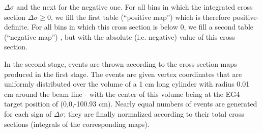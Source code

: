 $\Delta \sigma$ and the next for the negative one. For all bins in which the integrated cross section $\Delta \sigma \ge 0$, we fill the first table (``positive map'') which is therefore positive-definite. For all bins in which this cross section is below $0$, we fill a second table (``negative map'') , but with the absolute (i.e. negative) value of this cross section. %


In the second stage, events are thrown %
according to the cross section maps produced in the first stage. %
The events are given vertex coordinates that are uniformly distributed over the volume of a 1 cm long cylinder with radius 0.01 cm around the beam line - with the center of this volume being at the EG4 target position of (0,0,-100.93 cm). Nearly equal numbers of events are generated for each %
 sign of $\Delta \sigma$; they are finally normalized according to their total cross sections (integrals %
of the corresponding maps). %


